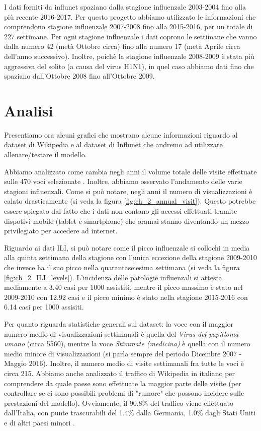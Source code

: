 I dati forniti da influnet spaziano dalla stagione influenzale 2003-2004 fino alla più recente 2016-2017. Per questo progetto 
abbiamo utilizzato le informazioni che comprendono stagione influenzale 2007-2008 fino alla 2015-2016, per un totale di 227 
settimane. Per ogni stagione influenzale i dati coprono le settimane che vanno dalla numero 42 (metà Ottobre circa) fino alla 
numero 17 (metà Aprile circa dell'anno successivo). Inoltre, poichè la stagione influenzale 2008-2009 è stata più aggressiva 
del solito (a causa del virus H1N1), in quel caso abbiamo dati fino che spaziano dall'Ottobre 2008 fino all'Ottobre 2009.

\section{Analisi}
\bigskip

Presentiamo ora alcuni grafici che mostrano alcune informazioni riguardo al dataset di Wikipedia e al dataset di Influnet che andremo ad utilizzare allenare/testare il modello. 
\bigskip

Abbiamo analizzato come cambia negli anni il volume totale delle visite effettuate sulle 470 voci selezionate . Inoltre, 
abbiamo osservato l'andamento delle varie stagioni influenzali. Come si può notare, negli anni il numero di visualizzazioni è 
calato drasticamente (si veda la figura \ref{fig:ch_2_annual_visit}). Questo potrebbe essere spiegato dal fatto che i dati 
non contano gli accessi effettuati tramite dispotivi mobile (tablet e smartphone) che oramai stanno diventando un mezzo 
privilegiato per accedere ad internet.
\bigskip

Riguardo ai dati ILI, si può notare come il picco influenzale si collochi in media alla quinta settimana della stagione con 
l'unica eccezione della stagione 2009-2010 che invece ha il suo picco nella quarantaseiesima settimana  (si veda la 
figura \ref{fig:ch_2_ILI_levels}). L'incidenza delle patologie influenzali si attesta mediamente a 3.40 casi per 1000 
assistiti, mentre il picco massimo è stato nel 2009-2010 con 12.92 casi e il picco minimo è stato nella stagione 2015-2016 
con 6.14 casi per 1000 assisiti.
\bigskip

Per quanto riguarda statistiche generali sul dataset: la voce con il maggior numero medio di visualizzazioni settimanali è quella del \textit{Virus del papilloma umano} (circa 5560), mentre la voce \textit{Stimmate (medicina)} è quella con il numero medio minore di visualizzazioni (si parla sempre del periodo Dicembre 2007 - Maggio 2016). Inoltre, il numero medio di visite settimanali fra tutte le voci è circa 215. Abbiamo anche analizzato il traffico di Wikipedia in italiano per comprendere da quale paese sono effettuate la maggior parte delle visite (per controllare se ci sono possibili problemi di "rumore" che possono incidere sulle prestazioni del modello). Ovviamente, il 90.8\% del traffico viene effettuato dall'Italia, con punte trascurabili del 1.4\% dalla Germania, 1.0\% dagli Stati Uniti e di altri paesi minori \cite{WikipediaStatsCountry}.
\bigskip


